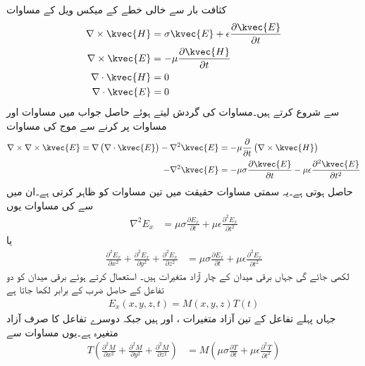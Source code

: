 کثافت بار سے خالی  خطے کے میکس ویل کے مساوات
\begin{align}
\nabla \times \kvec{H}&=\sigma \kvec{E}+\epsilon \frac{\partial \kvec{E}}{\partial t} \label{مساوات_مویج_مستطیلی_گھمکیا_الف}\\
\nabla \times \kvec{E}&=-\mu \frac{\partial \kvec{H}}{\partial t} \label{مساوات_مویج_مستطیلی_گھمکیا_ب}\\
\nabla \cdot \kvec{H}&=0 \label{مساوات_مویج_مستطیلی_گھمکیا_پ}\\
\nabla \cdot \kvec{E}&=0 \label{مساوات_مویج_مستطیلی_گھمکیا_ت}
\end{align}
 سے شروع کرتے ہیں۔مساوات  کی گردش لیتے ہوئے حاصل جواب میں مساوات  اور مساوات  پر کرنے سے موج کی مساوات 
\begin{align*}
\nabla \times \nabla \times \kvec{E}=\nabla \left(\nabla \cdot \kvec{E}\right)-\nabla^2 \kvec{E}&=-\mu \frac{\partial }{\partial t}\left(\nabla \times \kvec{H}\right)\\
-\nabla^2 \kvec{E}&=-\mu \sigma \frac{\partial \kvec{E}}{\partial t}-\mu\epsilon \frac{\partial^2 \kvec{E}}{\partial t^2}
\end{align*}
حاصل ہوتی ہے۔یہ سمتی مساوات حقیقت میں تین مساوات کو ظاہر کرتی ہے۔ان میں سے   کی مساوات یوں
\begin{align*}
\nabla^2 E_x&=\mu \sigma \frac{\partial E_x}{\partial t}+\mu\epsilon \frac{\partial^2 E_x}{\partial t^2}
\end{align*}
یا
\begin{align}\label{مساوات_مویج_مستطیلی_گھمکیا_ٹ}
\frac{\partial^2 E_x}{\partial x^2}+\frac{\partial^2 E_x}{\partial y^2}+\frac{\partial^2 E_x}{\partial z^2}&=\mu \sigma \frac{\partial E_x}{\partial t}+\mu\epsilon \frac{\partial^2 E_x}{\partial t^2}
\end{align}
لکھی جائے گی جہاں برقی میدان  کے چار آزاد متغیرات ہیں۔ استعمال کرتے ہوئے  برقی میدان کو دو تفاعل کے حاصل ضرب کے برابر لکھا جاتا ہے
\begin{align}\label{مساوات_مویج_مستطیلی_گھمکیا_ث}
E_x(x,y,z,t)=M(x,y,z) T(t)
\end{align} 
جہاں پہلے تفاعل  کے تین آزاد متغیرات ،  اور  ہیں جبکہ دوسرے تفاعل  کا صرف  آزاد متغیرہ ہے۔یوں مساوات  سے
\begin{align*}
T\left(\frac{\partial^2 M}{\partial x^2}+\frac{\partial^2 M}{\partial y^2}+\frac{\partial^2 M}{\partial z^2}\right)&=M\left(\mu \sigma \frac{\partial T}{\partial t}+\mu\epsilon \frac{\partial^2 T}{\partial t^2}\right)
\end{align*}
